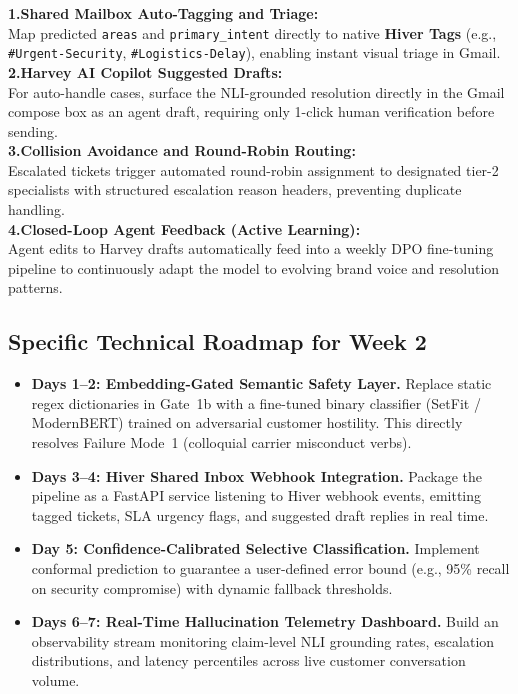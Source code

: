 \documentclass[10pt,twocolumn,a4paper]{article}
\begin{document}
\begin{tcolorbox}[hbox={Native Hiver Architecture Integration}]
\small
\textbf{1.\;Shared Mailbox Auto-Tagging and Triage:}\\
Map predicted \texttt{areas} and \texttt{primary\_intent} directly to
native \textbf{Hiver Tags} (e.g., \texttt{\#Urgent-Security},
\texttt{\#Logistics-Delay}), enabling instant visual triage in Gmail.\\[3pt]
\textbf{2.\;Harvey AI Copilot Suggested Drafts:}\\
For auto-handle cases, surface the NLI-grounded resolution directly in
the Gmail compose box as an agent draft, requiring only 1-click human
verification before sending.\\[3pt]
\textbf{3.\;Collision Avoidance and Round-Robin Routing:}\\
Escalated tickets trigger automated round-robin assignment to designated
tier-2 specialists with structured escalation reason headers, preventing
duplicate handling.\\[3pt]
\textbf{4.\;Closed-Loop Agent Feedback (Active Learning):}\\
Agent edits to Harvey drafts automatically feed into a weekly DPO
fine-tuning pipeline to continuously adapt the model to evolving
brand voice and resolution patterns.
\end{tcolorbox}
\vspace{-2pt}
\label{fig:hiver}

\subsection{Specific Technical Roadmap for Week 2}
\begin{itemize}
  \item \textbf{Days 1--2: Embedding-Gated Semantic Safety Layer.}
        Replace static regex dictionaries in Gate~1b with a fine-tuned
        binary classifier (SetFit / ModernBERT) trained on adversarial
        customer hostility. This directly resolves Failure Mode~1
        (colloquial carrier misconduct verbs).

  \item \textbf{Days 3--4: Hiver Shared Inbox Webhook Integration.}
        Package the pipeline as a FastAPI service listening to Hiver
        webhook events, emitting tagged tickets, SLA urgency flags, and
        suggested draft replies in real time.

  \item \textbf{Day 5: Confidence-Calibrated Selective Classification.}
        Implement conformal prediction to guarantee a user-defined error
        bound (e.g., 95\% recall on security compromise) with dynamic
        fallback thresholds.

  \item \textbf{Days 6--7: Real-Time Hallucination Telemetry Dashboard.}
        Build an observability stream monitoring claim-level NLI grounding
        rates, escalation distributions, and latency percentiles across
        live customer conversation volume.
\end{itemize}
\end{document}
